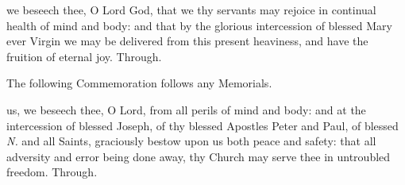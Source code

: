  we beseech thee, O Lord God, that we thy servants may rejoice in continual health of mind and body: and that by the glorious intercession of blessed Mary ever Virgin we may be delivered from this present heaviness, and have the fruition of eternal joy. Through.

\begin{rubric}
	The following Commemoration follows any Memorials.
\end{rubric}

 us, we beseech thee, O Lord, from all perils of mind and body: and at the intercession of blessed Joseph, of thy blessed Apostles Peter and Paul, of blessed \textit{N.} and all Saints, graciously bestow upon us both peace and safety: that all adversity and error being done away, thy Church may serve thee in untroubled freedom. Through.
